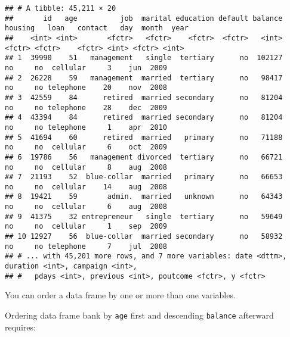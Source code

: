 \documentclass[]{book}
\newenvironment{Shaded}{\begin{snugshade}}{\end{snugshade}}
\newcommand{\KeywordTok}[1]{\textcolor[rgb]{0.13,0.29,0.53}{\textbf{{#1}}}}
\newcommand{\StringTok}[1]{\textcolor[rgb]{0.31,0.60,0.02}{{#1}}}
\newcommand{\NormalTok}[1]{{#1}}
\begin{document}
\begin{verbatim}
## # A tibble: 45,211 × 20
##       id   age          job  marital education default balance housing   loan   contact   day  month  year
##    <int> <int>       <fctr>   <fctr>    <fctr>  <fctr>   <int>  <fctr> <fctr>    <fctr> <int> <fctr> <int>
## 1  39990    51   management   single  tertiary      no  102127      no     no  cellular     3    jun  2009
## 2  26228    59   management  married  tertiary      no   98417      no     no telephone    20    nov  2008
## 3  42559    84      retired  married secondary      no   81204      no     no telephone    28    dec  2009
## 4  43394    84      retired  married secondary      no   81204      no     no telephone     1    apr  2010
## 5  41694    60      retired  married   primary      no   71188      no     no  cellular     6    oct  2009
## 6  19786    56   management divorced  tertiary      no   66721      no     no  cellular     8    aug  2008
## 7  21193    52  blue-collar  married   primary      no   66653      no     no  cellular    14    aug  2008
## 8  19421    59       admin.  married   unknown      no   64343      no     no  cellular     6    aug  2008
## 9  41375    32 entrepreneur   single  tertiary      no   59649      no     no  cellular     1    sep  2009
## 10 12927    56  blue-collar  married secondary      no   58932      no     no telephone     7    jul  2008
## # ... with 45,201 more rows, and 7 more variables: date <dttm>, duration <int>, campaign <int>,
## #   pdays <int>, previous <int>, poutcome <fctr>, y <fctr>
\end{verbatim}

You can order a data frame by one or more than one variables.

Ordering data frame bank by \texttt{age} first and descending
\texttt{balance} afterward requires:

\begin{Shaded}
\end{Shaded}
\end{document}

